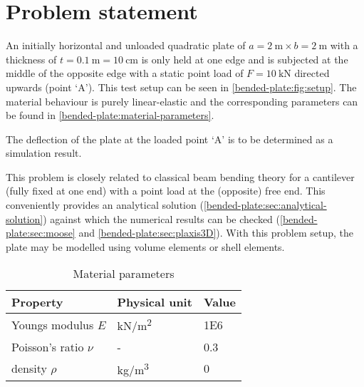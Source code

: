 \section{Problem statement}
\label{bended-plate:sec:problem-statement}

An initially horizontal and unloaded quadratic plate of $a = \qty{2}{\metre}
    \times b = \qty{2}{\metre}$ with a thickness of $t = \qty{0.1}{\metre} =
    \qty{10}{\centi\metre}$ is only held at one edge and is subjected at the middle
of the opposite edge with a static point load of $F = \qty{10}{\kilo\newton}$
directed upwards (point ‘A’). This test setup can be seen in
\autoref{bended-plate:fig:setup}. The material behaviour is purely
linear-elastic and the corresponding parameters can be found in
\autoref{bended-plate:material-parameters}.

The deflection of the plate at the loaded point ‘A’ is to be determined as a
simulation result.

This problem is closely related to classical beam bending theory for a
cantilever (fully fixed at one end) with a point load at the (opposite) free
end. This conveniently provides an analytical solution
(\autoref{bended-plate:sec:analytical-solution}) against which the numerical
results can be checked (\autoref{bended-plate:sec:moose} and
\autoref{bended-plate:sec:plaxis3D}). With this problem setup, the plate may be
modelled using volume elements or shell elements.

\begin{table}[htbp]
    \centering
    \caption{Material parameters}
    \label{bended-plate:material-parameters}
    \begin{tabularx}{\textwidth}{XYY}

        \hline

        Property              & Physical unit                                         & Value      \\

        \hline

        Youngs modulus $E$    & \si[per-mode = symbol]{\kilo\newton\per\square\metre} &
        \SI{1E6}{}                                                                                 \\

        Poisson's ratio $\nu$ & -                                                     & \SI{0.3}{} \\

        density $\rho$        & \si[per-mode = symbol]{\kilogram\per\cubic\metre}     & \SI{0}{}
        \\

        \hline
    \end{tabularx}
\end{table}

